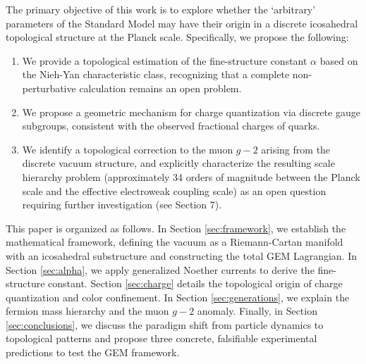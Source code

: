The primary objective of this work is to explore whether the `arbitrary' parameters of the Standard Model may have their origin in a discrete icosahedral topological structure at the Planck scale. Specifically, we propose the following:

\begin{enumerate}
    \item We provide a topological estimation of the fine-structure constant $\alpha$ based on the Nieh-Yan characteristic class, recognizing that a complete non-perturbative calculation remains an open problem.
    \item We propose a geometric mechanism for charge quantization via discrete gauge subgroups, consistent with the observed fractional charges of quarks.
    \item We identify a topological correction to the muon $g-2$ arising from the discrete vacuum structure, and explicitly characterize the resulting scale hierarchy problem (approximately 34 orders of magnitude between the Planck scale and the effective electroweak coupling scale) as an open question requiring further investigation (see Section 7).
\end{enumerate}

This paper is organized as follows. In Section \ref{sec:framework}, we establish the mathematical framework, defining the vacuum as a Riemann-Cartan manifold with an icosahedral substructure and constructing the total GEM Lagrangian. In Section \ref{sec:alpha}, we apply generalized Noether currents to derive the fine-structure constant. Section \ref{sec:charge} details the topological origin of charge quantization and color confinement. In Section \ref{sec:generations}, we explain the fermion mass hierarchy and the muon $g-2$ anomaly. Finally, in Section \ref{sec:conclusions}, we discuss the paradigm shift from particle dynamics to topological patterns and propose three concrete, falsifiable experimental predictions to test the GEM framework.